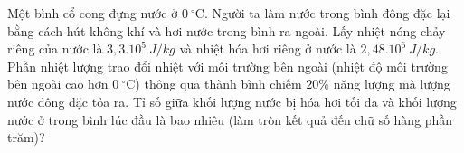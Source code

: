 \begin{ex}%
	Một bình cổ cong đựng nước ở $0\ ^\circ\mathrm{C}$. Người ta làm nước trong bình đông đặc lại bằng cách hút không khí và hơi nước trong bình ra ngoài. Lấy nhiệt nóng chảy riêng của nước là $3,3. 10^5\ J/kg$ và nhiệt hóa hơi riêng ở nước là $2, 48.10^6\ J/kg$. Phần nhiệt lượng trao đổi nhiệt với môi trường bên ngoài (nhiệt độ môi trường bên ngoài cao hơn $0\ ^\circ\mathrm{C}$) thông qua thành bình chiếm $20\%$ năng lượng mà lượng nước đông đặc tỏa ra. Tỉ số giữa khối lượng nước bị hóa hơi tối đa và khối lượng nước ở trong bình lúc đầu là bao nhiêu (làm tròn kết quả đến chữ số hàng phần trăm)?
\end{ex}
